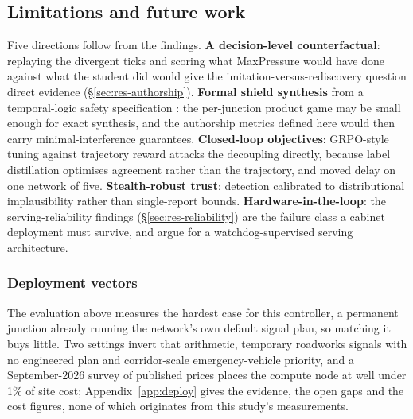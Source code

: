 \subsection{Limitations and future work}\label{sec:dis-future}
Five directions follow from the findings. \textbf{A decision-level
counterfactual}: replaying the divergent ticks and scoring what MaxPressure
would have done against what the student did would give the
imitation-versus-rediscovery question direct evidence
(\S\ref{sec:res-authorship}). \textbf{Formal shield synthesis} from a
temporal-logic safety specification \cite{alshiekh2018shield}: the
per-junction product game may be small enough for exact synthesis, and the
authorship metrics defined here would then carry minimal-interference
guarantees. \textbf{Closed-loop objectives}: GRPO-style tuning against
trajectory reward \cite{dglight2026} attacks the decoupling directly,
because label distillation optimises agreement rather than the trajectory,
and moved delay on one network of five. \textbf{Stealth-robust trust}:
detection calibrated to distributional implausibility rather than
single-report bounds. \textbf{Hardware-in-the-loop}: the
serving-reliability findings (\S\ref{sec:res-reliability}) are the failure
class a cabinet deployment must survive, and argue for a
watchdog-supervised serving architecture.

\subsubsection{Deployment vectors}\label{sec:dis-deploy}
The evaluation above measures the hardest case for this controller, a
permanent junction already running the network's own default signal plan,
so matching it buys little. Two settings invert that arithmetic, temporary
roadworks signals with no engineered plan and corridor-scale
emergency-vehicle priority, and a September-2026 survey of published
prices places the compute node at well under 1\% of site cost;
Appendix~\ref{app:deploy} gives the evidence, the open gaps and the cost
figures, none of which originates from this study's measurements.
